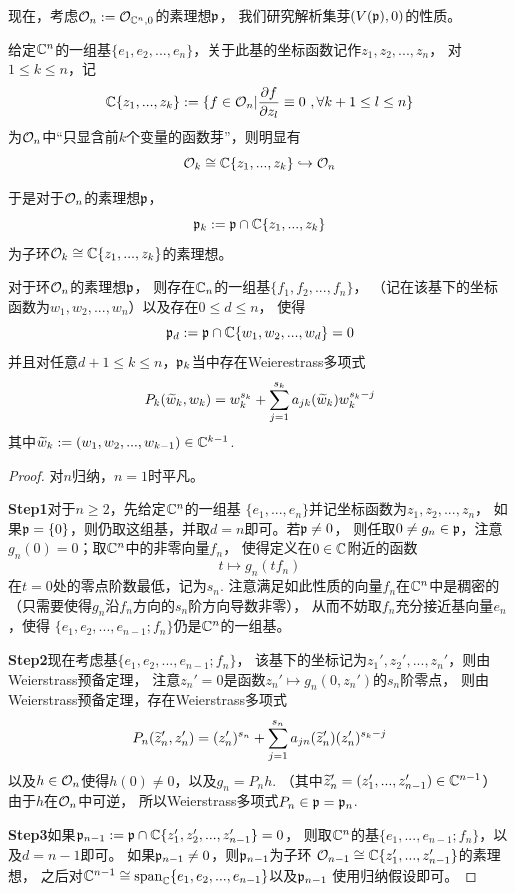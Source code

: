 现在，考虑$\mathcal{O}_n:=\mathcal{O}_{\mathbb{C}^n,0}$的素理想$\mathfrak{p}$，
我们研究解析集芽$(V(\mathfrak{p}),0)$的性质。

\begin{notation}
给定$\mathbb{C}^n$的一组基$\{e_1,e_2,...,e_n\}$，关于此基的坐标函数记作$z_1,z_2,...,z_n$，
对$1\leq k\leq n$，记
$$\mathbb{C}\{z_1,...,z_k\}:=
\{f\in\mathcal{O}_n|\frac{\partial f} {\partial z_l}\equiv0\,\,,\forall k+1\leq l\leq n\}$$
为$\mathcal{O}_n$中“只显含前$k$个变量的函数芽”，则明显有
$$\mathcal{O}_k\cong\mathbb{C}\{z_1,...,z_k\}\hookrightarrow\mathcal{O}_n$$
\end{notation}
于是对于$\mathcal{O}_n$的素理想$\mathfrak{p}$，
$$\mathfrak{p}_k:=\mathfrak{p}\cap\mathbb{C}\{z_1,...,z_k\}$$
为子环$\mathcal{O}_k\cong\mathbb{C}\{z_1,...,z_k\}$的素理想。

\begin{lemma}对于环$\mathcal{O}_n$的素理想$\mathfrak{p}$，
则存在$\mathbb{C}_n$的一组基$\{f_1,f_2,...,f_n\}$，
（记在该基下的坐标函数为$w_1,w_2,...,w_n$）以及存在$0\leq d\leq n$，
使得
$$\mathfrak{p}_d:=\mathfrak{p}\cap\mathbb{C}\{w_1,w_2,...,w_d\}=0$$
并且对任意$d+1\leq k\leq n$，$\mathfrak{p}_k$当中存在Weierestrass多项式
$$
  P_k(\widetilde{w}_k,w_k)=w_k^{s_k}+
  \sum_{j=1}^{s_k}
    a_{jk}(\widetilde{w}_k)
    w_k^{s_k-j}
$$
其中$\widetilde{w}_k:=(w_1,w_2,...,w_{k-1})\in\mathbb{C}^{k-1}$.
\label{不可约解析集芽局部性态-基本引理-lemma}
\end{lemma}

\begin{proof}
对$n$归纳，$n=1$时平凡。

\textbf{Step1}对于$n\geq 2$，先给定$\mathbb{C}^n$的一组基
$\{e_1,...,e_n\}$并记坐标函数为$z_1,z_2,...,z_n$，
如果$\mathfrak{p}=\{0\}$，则仍取这组基，并取$d=n$即可。若$\mathfrak{p}\neq 0$，
则任取$0\neq g_n\in\mathfrak{p}$，注意$g_n(0)=0$；取$\mathbb{C}^n$中的非零向量$f_n$，
使得定义在$0\in\mathbb{C}$附近的函数
$$t\mapsto g_n(tf_n)$$
在$t=0$处的零点阶数最低，记为$s_n$.
注意满足如此性质的向量$f_n$在$\mathbb{C}^n$中是稠密的
（只需要使得$g_n$沿$f_n$方向的$s_n$阶方向导数非零），
从而不妨取$f_n$充分接近基向量$e_n$，使得
$\{e_1,e_2,...,e_{n-1};f_n\}$仍是$\mathbb{C}^n$的一组基。\vs

\textbf{Step2}现在考虑基$\{e_1,e_2,...,e_{n-1};f_n\}$，
该基下的坐标记为$z_1',z_2',...,z_n'$，则由Weierstrass预备定理，
注意$z_n'=0$是函数$z_n'\mapsto g_n(0,z_n')$的$s_n$阶零点，
则由Weierstrass预备定理，存在Weierstrass多项式
$$
  P_n(\widetilde{z}'_n,z_n')=(z_n')^{s_n}
+ \sum_{j=1}^{s_n}
    a_{jn}(\widetilde{z}'_n)(z_n')^{s_k-j}
$$
以及$h\in\mathcal{O}_n$使得$h(0)\neq 0$，以及$g_n=P_nh$.
（其中$\widetilde{z}_n'=(z_1',...,z_{n-1}')\in\mathbb{C}^{n-1}$）
由于$h$在$\mathcal{O}_n$中可逆，
所以Weierstrass多项式$P_n\in\mathfrak{p}=\mathfrak{p}_n$.\vs

\textbf{Step3}如果$\mathfrak{p}_{n-1}:=\mathfrak{p}\cap\mathbb{C}\{z_1',z_2',...,z_{n-1}'\}=0$，
则取$\mathbb{C}^n$的基$\{e_1,...,e_{n-1};f_n\}$，以及$d=n-1$即可。
如果$\mathfrak{p}_{n-1}\neq 0$，则$\mathfrak{p}_{n-1}$为子环
$\mathcal{O}_{n-1}\cong\mathbb{C}\{z_1',...,z_{n-1}'\}$的素理想，
之后对$\mathbb{C}^{n-1}\cong\operatorname{span}_{\mathbb{C}}\{e_1,e_2,...,e_{n-1}\}$以及$\mathfrak{p}_{n-1}$
使用归纳假设即可。
\end{proof}

